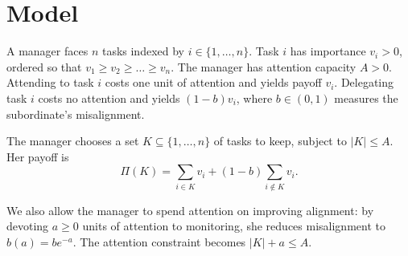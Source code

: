 \section{Model}
\label{sec:model}

A manager faces $n$ tasks indexed by $i \in \{1, \dots, n\}$. Task $i$ has importance $v_i > 0$, ordered so that $v_1 \geq v_2 \geq \dots \geq v_n$. The manager has attention capacity $A > 0$. Attending to task $i$ costs one unit of attention and yields payoff $v_i$. Delegating task $i$ costs no attention and yields $(1 - b) v_i$, where $b \in (0,1)$ measures the subordinate's misalignment.

The manager chooses a set $K \subseteq \{1, \dots, n\}$ of tasks to keep, subject to $|K| \leq A$. Her payoff is
\begin{equation}
\label{eq:payoff}
\Pi(K) = \sum_{i \in K} v_i + (1 - b) \sum_{i \notin K} v_i .
\end{equation}

We also allow the manager to spend attention on improving alignment: by devoting $a \geq 0$ units of attention to monitoring, she reduces misalignment to $b(a) = b e^{-a}$. The attention constraint becomes $|K| + a \leq A$.
